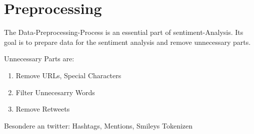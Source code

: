 \section{Preprocessing}
The Data-Preprocessing-Process is an essential part of sentiment-Analysis. Its goal is to prepare data
for the sentiment analysis and remove unnecessary parts.\autocite{Hemalatha2012}

Unnecessary Parts are:\autocite{Hemalatha2012}
\begin{enumerate}
    \item Remove URLs, Special Characters
    \item Filter Unnecesarry Words
    \item Remove Retweets
\end{enumerate}

Besondere an twitter: Hashtags, Mentions, Smileys
Tokenizen